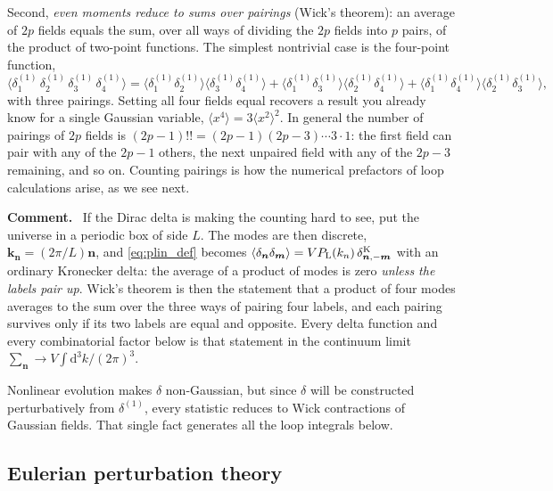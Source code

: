 \documentclass[a4paper,11pt]{article}
\newcommand{\vk}{\bm{k}}
\def\Plin{P_{\rm L}}
\newcommand{\dd}{\mathrm{d}}
\numberwithin{equation}{section}
\newenvironment{remark}
  {\par\medskip\noindent\begingroup\small\color{ForestGreen!60!black}\textbf{Comment.}\ }
  {\endgroup\par\medskip}
\begin{document}
Second, \emph{even moments reduce to sums over pairings} (Wick's theorem): an average of $2p$ fields equals the sum, over all ways of dividing the $2p$ fields into $p$ pairs, of the product of two-point functions. The simplest nontrivial case is the four-point function,
\begin{equation}
\langle \delta^{(1)}_1\,\delta^{(1)}_2\,\delta^{(1)}_3\,\delta^{(1)}_4\rangle
= \langle\delta^{(1)}_1\delta^{(1)}_2\rangle\langle\delta^{(1)}_3\delta^{(1)}_4\rangle
+ \langle\delta^{(1)}_1\delta^{(1)}_3\rangle\langle\delta^{(1)}_2\delta^{(1)}_4\rangle
+ \langle\delta^{(1)}_1\delta^{(1)}_4\rangle\langle\delta^{(1)}_2\delta^{(1)}_3\rangle ,
\label{eq:wick4}
\end{equation}
with three pairings. Setting all four fields equal recovers a result you already know for a single Gaussian variable, $\langle x^4\rangle = 3\langle x^2\rangle^2$. In general the number of pairings of $2p$ fields is $(2p-1)!! = (2p-1)(2p-3)\cdots 3\cdot 1$: the first field can pair with any of the $2p-1$ others, the next unpaired field with any of the $2p-3$ remaining, and so on. Counting pairings is how the numerical prefactors of loop calculations arise, as we see next.

\begin{remark}
If the Dirac delta is making the counting hard to see, put the universe in a periodic box of side $L$. The modes are then discrete, $\vk_{\bm{n}} = (2\pi/L)\bm{n}$, and \eqref{eq:plin_def} becomes $\langle\delta_{\bm{n}}\delta_{\bm{m}}\rangle = V\Plin(k_n)\,\delta^{\rm K}_{\bm{n},-\bm{m}}$ with an ordinary Kronecker delta: the average of a product of modes is zero \emph{unless the labels pair up}. Wick's theorem is then the statement that a product of four modes averages to the sum over the three ways of pairing four labels, and each pairing survives only if its two labels are equal and opposite. Every delta function and every combinatorial factor below is that statement in the continuum limit $\sum_{\bm{n}} \to V\!\int\!\dd^3k/(2\pi)^3$.
\end{remark}

Nonlinear evolution makes $\delta$ non-Gaussian, but since $\delta$ will be constructed perturbatively from $\delta^{(1)}$, every statistic reduces to Wick contractions of Gaussian fields. That single fact generates all the loop integrals below.

\subsection{Eulerian perturbation theory}
\label{sec:ept}
\end{document}
